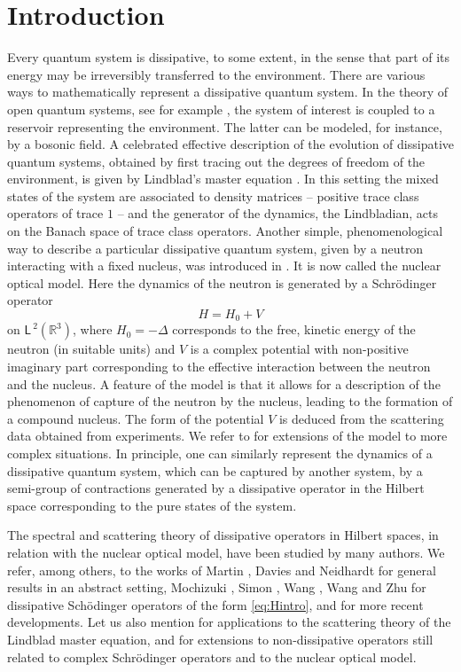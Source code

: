 \documentclass{article}
\def\R{\mathbb R}
\def\ltwo{\mathsf{L}^{\:\!\!2}}
\begin{document}
\section{Introduction}

Every quantum system is dissipative, to some extent, in the sense that part of its energy may be irreversibly transferred to the environment. 
There are various ways to mathematically represent a dissipative quantum system. 
In the theory of open quantum systems, see for example \cite{Da76,Ex85}, the system of interest is coupled to a reservoir  
representing the environment. The latter can be modeled, for instance, by a bosonic field. 
A celebrated effective description of the evolution of dissipative quantum systems, 
obtained by first tracing out the degrees of freedom of the environment, is given by Lindblad's master equation \cite{Li76}. 
In this setting the mixed states of the system are associated to density matrices -- positive trace class operators of trace $1$ -- 
and the generator of the dynamics, the Lindbladian, acts on the Banach space of trace class operators. 
Another simple, phenomenological way to describe a particular dissipative quantum system, given by a neutron interacting with a fixed nucleus, 
was introduced in \cite{FePoWe54_01}. It is now called the nuclear optical model. Here the dynamics of the neutron is generated 
by a Schr\"odinger operator
\begin{equation}\label{eq:Hintro}
H=H_0+V
\end{equation}
on $\ltwo(\R^3)$, where $H_0=-\Delta$ corresponds to the free, kinetic energy of the neutron (in suitable units) 
and $V$ is a complex potential with non-positive imaginary part corresponding to the effective interaction 
between the neutron and the nucleus. 
A feature of the model is that it allows for a description of the phenomenon of capture of the neutron by the nucleus, 
leading to the formation of a compound nucleus. 
The form of the potential $V$ is deduced from the scattering data obtained from experiments. 
We refer to \cite{Ho71,Fe92} for extensions of the model to more complex situations. 
In principle, one can similarly represent the dynamics of a dissipative quantum system, 
which can be captured by another system, by a semi-group of contractions generated 
by a dissipative operator in the Hilbert space corresponding to the pure states of the system.

The spectral and scattering theory of dissipative operators in Hilbert spaces, 
in relation with the nuclear optical model, have been studied by many authors. 
We refer, among others, to the works of Martin \cite{Ma75}, Davies \cite{Da79,Da80_01} and Neidhardt \cite{Ne85} 
for general results in an abstract setting, Mochizuki \cite{Mo68}, Simon \cite{Si79}, Wang \cite{Wa11,Wa12}, Wang and Zhu \cite{WaZh14} 
for dissipative Sch\"odinger operators of the form \eqref{eq:Hintro}, and 
\cite{Fa21,FaFr18,FN} for more recent developments. 
Let us also mention \cite{FaFaFrSc17,FaFr18} for applications to the scattering theory of the Lindblad master equation, 
and \cite{FaFr23,Fr24} for extensions to non-dissipative operators still related to complex Schr\"odinger operators 
and to the nuclear optical model.
\end{document}
